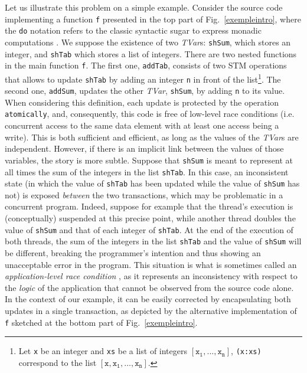\documentclass[submission,copyright,creativecommons]{eptcs}
\begin{document}
Let us illustrate this problem on a simple example. Consider the source code implementing a function \texttt{f} presented in the top part of Fig.~\ref{exempleintro}, where the {\tt do} notation refers to the classic syntactic sugar to express monadic computations \cite{transactional-memory-data,report-programming-language}.   
We suppose the existence of two \emph{TVar}s: \texttt{shSum}, which stores an integer, and \texttt{shTab} which stores a list of integers.
There are two nested functions in the main function {\tt f}.
The first one, \texttt{addTab}, consists of two STM operations that allows to update \texttt{shTab} by adding an integer {\tt n} in front of the list\footnote{Let \texttt{x} be an integer and \texttt{xs} be a list of integers $\mathtt{[x_1,...,x_n]}$, \texttt{(x:xs)} correspond to the list $\mathtt{[x,x_1,...,x_n]}$.}. The second one, \texttt{addSum}, updates the other \emph{TVar}, \texttt{shSum}, by adding {\tt n} to its value. 
When considering this definition, each update is protected by the operation {\tt atomically}, and, consequently, this code is free of low-level race conditions (i.e. concurrent access to the same data element with at least one access being a write). 
This is both sufficient and efficient, as long as the values of the \emph{TVar}s are independent. 
However, if there is an implicit link between the values of those variables, the story is more subtle. Suppose that {\tt shSum} is meant to represent at all times the sum of the integers in the list {\tt shTab}.
In this case, an inconsistent state (in which the value of {\tt shTab} has been updated while the value of {\tt shSum} has not) is exposed {\em between} the two transactions, which may be problematic in a concurrent program. 
Indeed, suppose for example that the thread's execution is (conceptually) suspended at this precise point, while another thread doubles the value of {\tt shSum} and that of each integer of {\tt shTab}. 
At the end of the execution of both threads, the sum of the integers in the list {\tt shTab} and the value of {\tt shSum} will be different, breaking the programmer's intention and thus showing an unacceptable error in the program. 
This situation is what is sometimes called an {\em application-level race condition} \cite{verifying-correct-usage,rdemeyer:framework-verifying-application}, as it represents an inconsistency with respect to the {\em logic} of the application that cannot be observed from the source code alone. 
In the context of our example, it can be easily corrected by encapsulating both updates in a single transaction, as depicted by the alternative implementation of \texttt{f} sketched at the bottom part of Fig.~\ref{exempleintro}.
\end{document}
